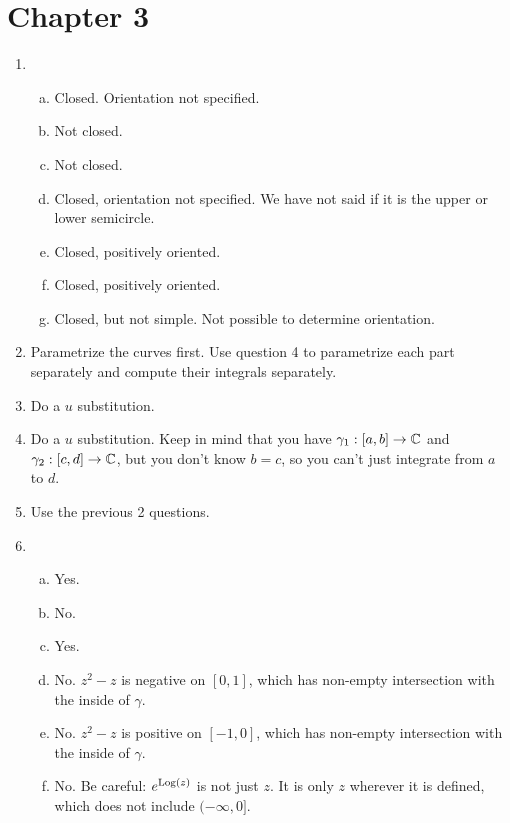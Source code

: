 \section{Chapter 3}

\begin{enumerate}

\item\begin{enumerate}[a)]
\item Closed. Orientation not specified.
\item Not closed.
\item Not closed.
\item Closed, orientation not specified. We have not said if it is the upper or lower semicircle.
\item Closed, positively oriented.
\item Closed, positively oriented.
\item Closed, but not simple. Not possible to determine orientation.
\end{enumerate}

\item Parametrize the curves first. Use question 4 to parametrize each part separately and compute their integrals separately.

\item Do a $u$ substitution.

\item Do a $u$ substitution. Keep in mind that you have $\gamma_1: [a,b]\rightarrow \mathbb{C}$ and $\gamma_2:[c,d]\rightarrow \mathbb{C}$, but you don't know $b = c$, so you can't just integrate from $a$ to $d$.

\item Use the previous 2 questions.

\item \begin{enumerate}[a)]
\item Yes.
\item No.
\item Yes.
\item No. $z^2 - z$ is negative on $[0,1]$, which has non-empty intersection with the inside of $\gamma$.
\item No. $z^2 - z$ is positive on $[-1,0]$, which has non-empty intersection with the inside of $\gamma$.
\item No. Be careful: $e^{\mathrm{Log}(z)}$ is not just $z$. It is only $z$ wherever it is defined, which does not include $(-\infty,0]$.
\end{enumerate}


\end{enumerate}
